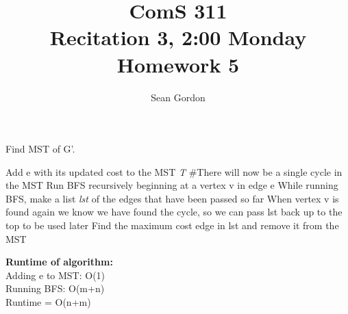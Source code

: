 \documentclass[12pt]{article}
\title{ComS 311\\Recitation 3, 2:00 Monday\\Homework 5}
\author{Sean Gordon}
\begin{document}
\maketitle






\begin{algorithm}[H]
\caption{Find MST of G'.}
\begin{algorithmic}
\State Add e with its updated cost to the MST \textit{T}
\State \#There will now be a single cycle in the MST
\State Run BFS recursively beginning at a vertex v in edge e
\State \indent While running BFS, make a list \textit{lst} of the edges that have
\State \indent been passed so far
\State \indent When vertex v is found again we know we have found the cycle,
\State \indent so we can pass lst back up to the top to be used later
\State Find the maximum cost edge in lst and remove it from the MST
\end{algorithmic}
\end{algorithm}
\noindent \textbf{Runtime of algorithm:} \\
Adding e to MST: O(1)\\
Running BFS: O(m+n)\\
Runtime = O(n+m)

\end{document}

